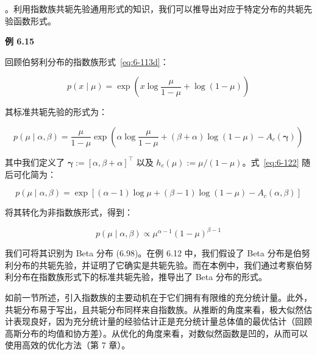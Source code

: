 。利用指数族共轭先验通用形式的知识，我们可以推导出对应于特定分布的共轭先验函数形式。

\begin{notebox}
\textbf{例 6.15}
\end{notebox}

\begin{notebox}
回顾伯努利分布的指数族形式~\eqref{eq:6-113d}：

\begin{equation}
p(x \mid \mu) = \exp \left( x \log \frac{\mu}{1 - \mu} + \log(1 - \mu) \right)
\tag{6.121}\label{eq:6-121}
\end{equation}

其标准共轭先验的形式为：

\begin{equation}
p(\mu \mid \alpha, \beta) = \frac{\mu}{1 - \mu} \exp \left( \alpha \log \frac{\mu}{1 - \mu} + (\beta + \alpha) \log(1 - \mu) - A_c(\boldsymbol{\gamma}) \right)
\tag{6.122}\label{eq:6-122}
\end{equation}

其中我们定义了 $ \boldsymbol{\gamma} := [\alpha, \beta + \alpha]^\top $ 以及 $ h_c(\mu) := \mu / (1 - \mu) $。式~\eqref{eq:6-122} 随后可化简为：

\begin{equation}
p(\mu \mid \alpha, \beta) = \exp \left[ (\alpha - 1) \log \mu + (\beta - 1) \log(1 - \mu) - A_c(\alpha, \beta) \right]
\tag{6.123}\label{eq:6-123}
\end{equation}

将其转化为非指数族形式，得到：

\begin{equation}
p(\mu \mid \alpha, \beta) \propto \mu^{\alpha - 1} (1 - \mu)^{\beta - 1}
\tag{6.124}\label{eq:6-124}
\end{equation}

我们可将其识别为 Beta 分布 (6.98)。在例 6.12 中，我们假设了 Beta 分布是伯努利分布的共轭先验，并证明了它确实是共轭先验。而在本例中，我们通过考察伯努利分布在指数族形式下的标准共轭先验，推导出了 Beta 分布的形式。
\end{notebox}

如前一节所述，引入指数族的主要动机在于它们拥有有限维的充分统计量。此外，共轭分布易于写出，且共轭分布同样来自指数族。从推断的角度来看，极大似然估计表现良好，因为充分统计量的经验估计正是充分统计量总体值的最优估计（回顾高斯分布的均值和协方差）。从优化的角度来看，对数似然函数是凹的，从而可以使用高效的优化方法（第 7 章）。
